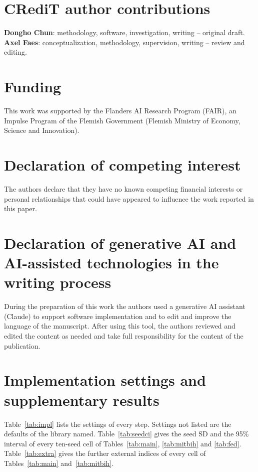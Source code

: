 \documentclass[preprint,11pt]{elsarticle}
\begin{document}
\section*{CRediT author contributions}
\textbf{Dongho Chun}: methodology, software, investigation, writing -- original draft.
\textbf{Axel Faes}: conceptualization, methodology, supervision, writing -- review and
editing.

\section*{Funding}
This work was supported by the Flanders AI Research Program (FAIR), an Impulse Program of the Flemish Government (Flemish Ministry of Economy, Science and Innovation).

\section*{Declaration of competing interest}
The authors declare that they have no known competing financial interests or personal relationships that could have appeared to influence the work reported in this paper.

\section*{Declaration of generative AI and AI-assisted technologies in the writing process}
During the preparation of this work the authors used a generative AI assistant (Claude) to support software implementation and to edit and improve the language of the manuscript. After using this tool, the authors reviewed and edited the content as needed and take full responsibility for the content of the publication.

\appendix
\setcounter{table}{0}

\section{Implementation settings and supplementary results}\label{app:impl}

Table~\ref{tab:impl} lists the settings of every step. Settings not listed are the
defaults of the library named. Table~\ref{tab:seedci} gives the seed SD and the 95\%
interval of every ten-seed cell of Tables~\ref{tab:main}, \ref{tab:mitbih} and
\ref{tab:fed}. Table~\ref{tab:extra} gives the further external indices of every cell of
Tables~\ref{tab:main} and~\ref{tab:mitbih}.
\end{document}
